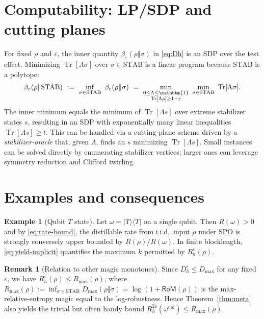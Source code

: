 \documentclass[11pt]{article}
\theoremstyle{definition}
\newtheorem{remark}{Remark}
\newtheorem{example}{Example}
\DeclareMathOperator{\Tr}{Tr}
\newcommand{\id}{\mathbbm{1}}
\newcommand{\Dh}[1]{D_h^{#1}}
\newcommand{\Dm}{D_{\max}}
\begin{document}
\section{Computability: LP/SDP and cutting planes}
For fixed $\rho$ and $\varepsilon$, the inner quantity $\beta_\varepsilon(\rho\Vert\sigma)$ in \eqref{eq:Dh} is an SDP over the test effect. Minimizing $\Tr[\Lambda\sigma]$ over $\sigma\in\mathrm{STAB}$ is a linear program because $\mathrm{STAB}$ is a polytope:
\begin{align}
\beta_\varepsilon(\rho\Vert \mathrm{STAB})\ :=\ \inf_{\sigma\in\mathrm{STAB}}\ \beta_\varepsilon(\rho\Vert\sigma)
\ =\ \min_{\substack{0\le \Lambda\le \id\\ \Tr[\Lambda\rho]\ge 1-\varepsilon}}\ \min_{\sigma\in\mathrm{STAB}}\ \Tr[\Lambda\sigma].
\end{align}
The inner minimum equals the minimum of $\Tr[\Lambda s]$ over extreme stabilizer states $s$, resulting in an SDP with exponentially many linear inequalities $\Tr[\Lambda s]\ge t$. This can be handled via a cutting-plane scheme driven by a \emph{stabilizer-oracle} that, given $\Lambda$, finds an $s$ minimizing $\Tr[\Lambda s]$. Small instances can be solved directly by enumerating stabilizer vertices; larger ones can leverage symmetry reduction and Clifford twirling.

\section{Examples and consequences}
\begin{example}[Qubit $T$ state]
Let $\omega = \lvert T\rangle\!\langle T\rvert$ on a single qubit. Then $R(\omega)>0$ and by \eqref{eq:rate-bound}, the distillable rate from i.i.d.\ input $\rho$ under SPO is strongly conversely upper bounded by $\overline{R}(\rho)/R(\omega)$. In finite blocklength, \eqref{eq:yield-implicit} quantifies the maximum $k$ permitted by $R_h^{\varepsilon}(\rho)$.
\end{example}

\begin{remark}[Relation to other magic monotones]
Since $\Dh{\varepsilon}\le \Dm$ for any fixed $\varepsilon$, we have $R_h^{\varepsilon}(\rho)\le R_{\max}(\rho)$, where $R_{\max}(\rho):=\inf_{\sigma\in\mathrm{STAB}}\Dm(\rho\Vert\sigma)=\log(1+\mathsf{RoM}(\rho))$ is the max-relative-entropy magic equal to the log-robustness. Hence Theorem~\ref{thm:meta} also yields the trivial but often handy bound $R_h^{2\varepsilon}(\omega^{\otimes k})\le R_{\max}(\rho)$.
\end{remark}
\end{document}
